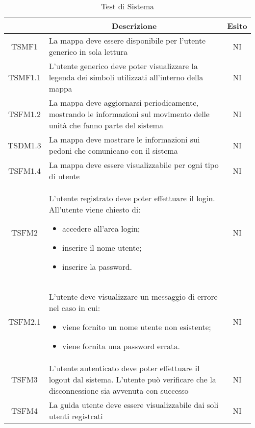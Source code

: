	\newcommand*{\thead}[1]{\multicolumn{1}{c}{\bfseries #1}}
	\setlength{\tabcolsep}{10pt}
	\begin{longtable}[h!] { c  m{12cm} c}
		\caption{Test di Sistema} \\
		\rowcolor{lightgray}
		\thead{Test}  & \thead{Descrizione} & \thead{Esito} \\ \endhead%

		TSMF1   & La mappa deve essere disponibile per l'utente generico in sola lettura	& NI \\

		TSMF1.1 & L'utente generico deve poter visualizzare la legenda dei simboli utilizzati all'interno della mappa & NI \\

		TSFM1.2 & La mappa deve aggiornarsi periodicamente, mostrando le informazioni sul movimento delle unità che fanno parte del sistema & NI\\

		TSDM1.3 & La mappa deve mostrare le informazioni sui pedoni che comunicano con il sistema & NI \\

		TSFM1.4 & La mappa deve essere visualizzabile per ogni tipo di utente & NI\\


		TSFM2   & L'utente registrato deve poter effettuare il login. All'utente viene chiesto di:
				\begin{itemize}
					\item accedere all'area login;
					\item inserire il nome utente;
					\item inserire la password.
				\end{itemize}
								& NI \\

		TSFM2.1 & L'utente deve visualizzare un messaggio di errore nel caso in cui:
					\begin{itemize}
						\item viene fornito un nome utente non esistente;
						\item viene fornita una password errata.
					\end{itemize}
									& NI \\
		TSFM3   & L'utente autenticato deve poter effettuare il logout dal sistema. L'utente può verificare che la disconnessione sia avvenuta con successo & NI \\

		TSFM4   & La guida utente deve essere visualizzabile dai soli utenti registrati & NI \\


\end{longtable}
